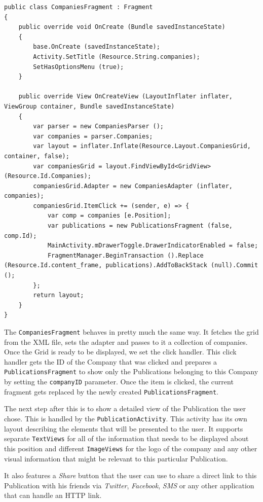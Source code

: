 \begin{lstlisting}[frame=lt,caption=CompaniesFragment.cs, label={list:comp_frag}]
public class CompaniesFragment : Fragment
{
	public override void OnCreate (Bundle savedInstanceState)
	{
		base.OnCreate (savedInstanceState);
		Activity.SetTitle (Resource.String.companies);
		SetHasOptionsMenu (true);
	}

	public override View OnCreateView (LayoutInflater inflater, ViewGroup container, Bundle savedInstanceState)
	{
		var parser = new CompaniesParser ();
		var companies = parser.Companies;
		var layout = inflater.Inflate(Resource.Layout.CompaniesGrid, container, false);
		var companiesGrid = layout.FindViewById<GridView> (Resource.Id.Companies);
		companiesGrid.Adapter = new CompaniesAdapter (inflater, companies);
		companiesGrid.ItemClick += (sender, e) => {
			var comp = companies [e.Position];
			var publications = new PublicationsFragment (false, comp.Id);
			MainActivity.mDrawerToggle.DrawerIndicatorEnabled = false;
			FragmentManager.BeginTransaction ().Replace (Resource.Id.content_frame, publications).AddToBackStack (null).Commit ();
		};
		return layout;
	}
}
\end{lstlisting}

The \texttt{CompaniesFragment} behaves in pretty much the same way. It fetches the grid from the \ac{XML} file, sets the adapter and passes to it a collection of companies. Once the Grid is ready to be displayed, we set the click handler. This click handler gets the ID of the Company that was clicked and prepares a \texttt{PublicationsFragment} to show only the Publications belonging to this Company by setting the \texttt{companyID} parameter. Once the item is clicked, the current fragment gets replaced by the newly created \texttt{PublicationsFragment}.

The next step after this is to show a detailed view of the Publication the user chose. This is handled by the \texttt{PublicationActivity}. This activity has its own layout describing the elements that will be presented to the user. It supports separate \texttt{TextViews} for all of the information that needs to be displayed about this position and different \texttt{ImageViews} for the logo of the company and any other visual information that might be relevant to this particular Publication.

It also features a \textit{Share} button that the user can use to share a direct link to this Publication with his friends via \textit{Twitter}, \textit{Facebook}, \textit{SMS} or any other application that can handle an HTTP link.\newline

